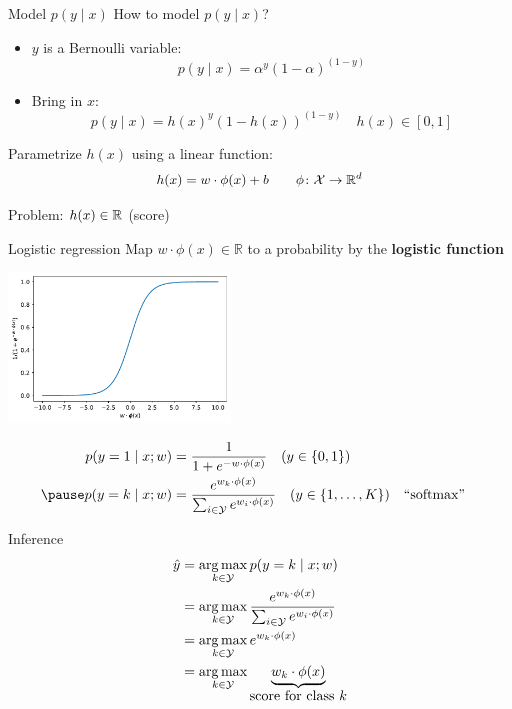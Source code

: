 \documentclass[usenames,dvipsnames,notes,11pt,aspectratio=169]{beamer}
\newcommand{\pdfnote}[1]{}
\begin{document}
\begin{frame}
    {Model $p(y\mid x)$}
    How to model $p(y\mid x)$?
    \begin{itemize}
        \item[] $y$ is a Bernoulli variable:
            $$
            p(y\mid x) = \alpha^y (1-\alpha)^{(1-y)}
            $$
            \pause
        \item[] Bring in $x$:
            $$
            p(y\mid x) = h(x)^y (1-h(x))^{(1-y)} \quad h(x) \in [0,1]
            $$
    \end{itemize}

    \pause
    Parametrize $h(x)$ using a linear function:\\
    $$
    h(x) = w\cdot \phi(x) + b \quad\quad \phi\colon \mathcal{X} \rightarrow \mathbb{R}^d
    $$

    Problem: $h(x) \in \mathbb{R}$ (score)
\end{frame}

\begin{frame}
    {Logistic regression}
    Map $w\cdot\phi(x) \in\mathbb{R}$ to a probability by the \textbf{logistic function}
    \vspace{-1em}
    \begin{center}
        \includegraphics[height=4cm]{figures/logistic}
    \end{center}
    \vspace{-2em}
    \begin{align*}
    p(y=1\mid x; w) &= \frac{1}{1 + e^{-w\cdot\phi(x)}} \quad (y\in \pc{0,1})\\\pause
        p(y=k\mid x; w) &= \frac{e^{w_k\cdot\phi(x)}}{\sum_{i\in\mathcal{Y}}e^{w_i\cdot\phi(x)}} \quad (y\in \pc{1, \ldots, K}) && \text{``softmax''}
    \end{align*}
    \pdfnote{
        Note that in multiclass classification setting, there is one $w$ for each class.
    }
\end{frame}

\begin{frame}
    {Inference}
    \begin{align}
        \hat{y} &= \operatorname*{arg\,max}_{k\in\mathcal{Y}} p(y=k\mid x; w) \\
        &= \operatorname*{arg\,max}_{k\in\mathcal{Y}} \frac{e^{w_k\cdot\phi(x)}}{\sum_{i\in\mathcal{Y}}e^{w_i\cdot\phi(x)}} \\
        &= \operatorname*{arg\,max}_{k\in\mathcal{Y}} e^{w_k\cdot\phi(x)} \\
        &= \operatorname*{arg\,max}_{k\in\mathcal{Y}} \underbrace{w_k\cdot\phi(x)}_{\textstyle\text{score for class $k$}}
    \end{align}
\end{frame}
\end{document}
